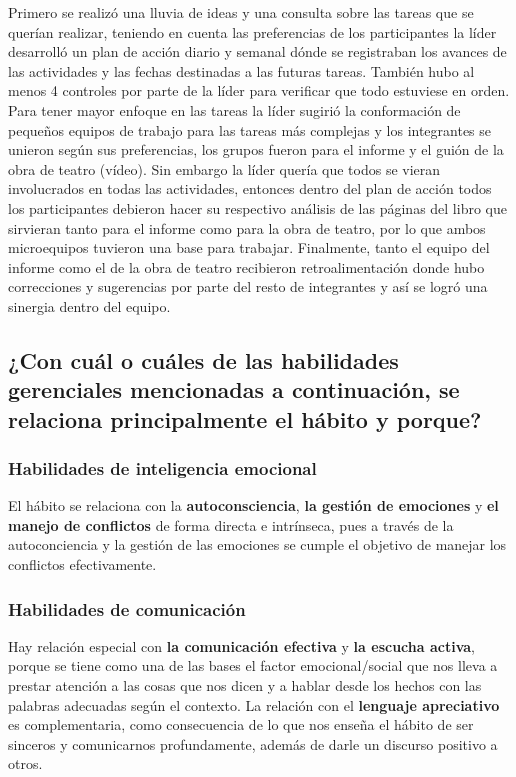 \documentclass[onecolumn]{article} %
\begin{document}
	Primero se realizó una lluvia de ideas y una consulta sobre las tareas que se querían realizar, teniendo en cuenta las preferencias de los participantes la líder desarrolló un plan de acción diario y semanal dónde se registraban los avances de las actividades y las fechas destinadas a las futuras tareas. También hubo al menos 4 controles por parte de la líder para verificar que todo estuviese en orden. Para tener mayor enfoque en las tareas la líder sugirió la conformación de pequeños equipos de trabajo para las tareas más complejas y los integrantes se unieron según sus preferencias, los grupos fueron para el informe y el guión de la obra de teatro (vídeo). Sin embargo la líder quería que todos se vieran involucrados en todas las actividades, entonces dentro del plan de acción todos los participantes debieron hacer su respectivo análisis de las páginas del libro que sirvieran tanto para el informe como para la obra de teatro, por lo que ambos microequipos tuvieron una base para trabajar. Finalmente, tanto el equipo del informe como el de la obra de teatro recibieron retroalimentación donde hubo correcciones y sugerencias por parte del resto de integrantes y así se logró una sinergia dentro del equipo.
	
	\subsection{¿Con cuál o cuáles de las habilidades gerenciales mencionadas a continuación, se relaciona principalmente el hábito y porque?}
	
	\subsubsection{Habilidades de inteligencia emocional}
	
	El hábito se relaciona con la \textbf{autoconsciencia}, \textbf{la gestión de emociones} y \textbf{el manejo de conflictos} de forma directa e intrínseca, pues a través de la autoconciencia y la gestión de las emociones se cumple el objetivo de manejar los conflictos efectivamente.
	
	\subsubsection{Habilidades de comunicación}
	
	Hay relación especial con \textbf{la comunicación efectiva} y \textbf{la escucha activa}, porque se tiene como una de las bases el factor emocional/social que nos lleva a prestar atención a las cosas que nos dicen y a hablar desde los hechos con las palabras adecuadas según el contexto. La relación con el \textbf{lenguaje apreciativo} es complementaria, como consecuencia de lo que nos enseña el hábito de ser sinceros y comunicarnos profundamente, además de darle un discurso positivo a otros.
	
\end{document}
